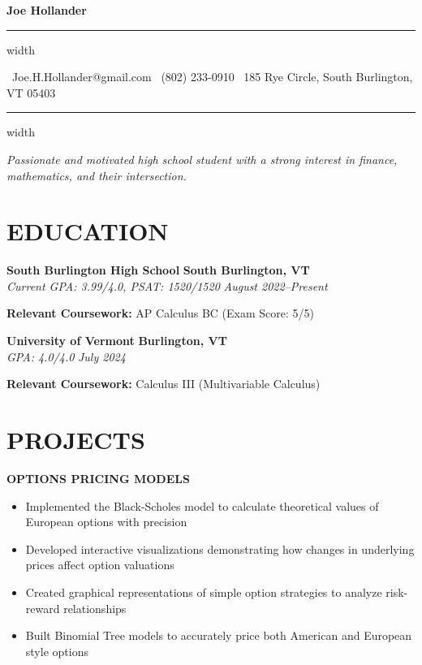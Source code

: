 \documentclass[10pt,letterpaper]{article}
\newcommand{\name}[1]{
  \begin{center}
    \Huge\textbf{\color{headingcolor}#1}
  \end{center}
  \vspace{-0.5em}
  \hrule height 0.8pt width \textwidth
  \vspace{0.5em}
}
\newcommand{\contact}[3]{
  \begin{center}
    \faEnvelope\ #1 \hspace{1em} \faPhone\ #2 \hspace{1em} \faMapMarker*\ #3
  \end{center}
  \vspace{-0.5em}
  \hrule height 0.4pt width \textwidth
  \vspace{0.5em}
}
\newcommand{\role}[4]{
  \textbf{\color{subheadingcolor}#1} \hfill \textbf{#2} \\
  \textit{#3} \hfill \textit{#4}
}
\begin{document}
\name{Joe Hollander}
\vspace{-0.25em}
\contact{Joe.H.Hollander@gmail.com}{(802) 233-0910}{185 Rye Circle, South Burlington, VT 05403}

\vspace{-0.25em}
\begin{center}
\textit{Passionate and motivated high school student with a strong interest in finance, mathematics, and their intersection.}
\end{center}

\section{EDUCATION}

\vspace{0.5em}
\role{South Burlington High School}{South Burlington, VT}{Current GPA: 3.99/4.0, PSAT: 1520/1520}{August 2022--Present}   
\begin{flushleft}
\textbf{Relevant Coursework:} AP Calculus BC (Exam Score: 5/5)\\
\end{flushleft}

\vspace{0.5em}
\begin{flushleft}
\textbf{\color{subheadingcolor}University of Vermont} \hfill \textbf{Burlington, VT} \\
\textit{GPA: 4.0/4.0} \hfill \textit{July 2024}
\end{flushleft}
\begin{flushleft}
\textbf{Relevant Coursework:} Calculus III (Multivariable Calculus)\\
\end{flushleft}

\vspace{0.5em}
\section{PROJECTS}
\vspace{0.5em}

\begin{flushleft}
  \textbf{\color{subheadingcolor}OPTIONS PRICING MODELS}
  \begin{itemize}[leftmargin=*,nosep,itemsep=2pt]
      \item Implemented the Black-Scholes model to calculate theoretical values of European options with precision
      \item Developed interactive visualizations demonstrating how changes in underlying prices affect option valuations
      \item Created graphical representations of simple option strategies to analyze risk-reward relationships
      \item Built Binomial Tree models to accurately price both American and European style options
  \end{itemize}
  \end{flushleft}
\end{document}
